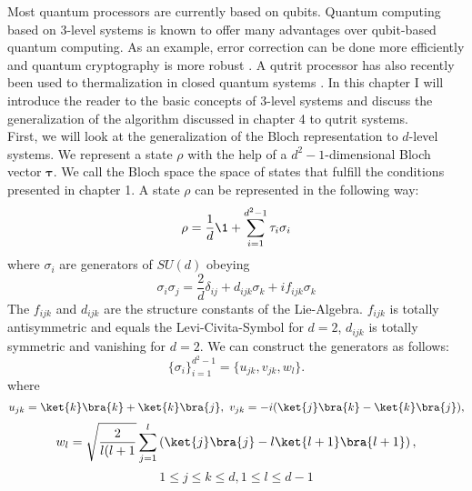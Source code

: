 Most quantum processors are currently based on qubits.
Quantum computing based on $3$-level systems is known to offer many advantages over qubit-based quantum computing.
As an example, error correction can be done more efficiently \cite{campbell14} and quantum cryptography is more robust \cite{bechmann00}.
A qutrit processor has also recently been used to thermalization in closed quantum systems \cite{blok20}.
In this chapter I will introduce the reader to the basic concepts of $3$-level systems and discuss the generalization of the algorithm discussed in chapter 4 to qutrit systems.\\
First, we will look at the generalization of the Bloch representation to $d$-level systems.
We represent a state $\rho$ with the help of a $d^2-1$-dimensional Bloch vector $\bm{\tau}$.
We call the Bloch space the space of states that fulfill the conditions presented in chapter 1.
A state $\rho$ can be represented in the following way:
$$\rho = \frac{1}{d} \1 + \sum_{i=1}^{d^2-1} \tau_i \sigma_i$$
where $\sigma_i$ are generators of $SU(d)$ obeying
\begin{equation}\label{sig}
	\sigma_i\sigma_j = \frac{2}{d}\delta_{ij} + d_{ijk}\sigma_k + if_{ijk}\sigma_k
\end{equation}
The $f_{ijk}$ and $d_{ijk}$ are the structure constants of the Lie-Algebra.
$f_{ijk}$ is totally antisymmetric and equals the Levi-Civita-Symbol for $d=2$, $d_{ijk}$ is totally symmetric and vanishing for $d=2$.
We can construct the generators as follows:\cite{kimura03}
 \[
\{\sigma_i\}^{d^2-1}_{i=1} = \{u_{jk},v_{jk},w_l\}
.\]
where
$$
	u_{jk} = \ket{k}\bra{k}+\ket{k}\bra{j}, ~ v_{jk} = -i(\ket{j}\bra{k}-\ket{k}\bra{j}),
$$
$$
	w_l = \sqrt{\frac{2}{l(l+1}} \sum_{j=1}^{l} \left( \ket{j}\bra{j}-l\ket{l+1}\bra{l+1} \right),$$
	$$ 1\le j\le k\le d, 1\le l\le d-1$$

